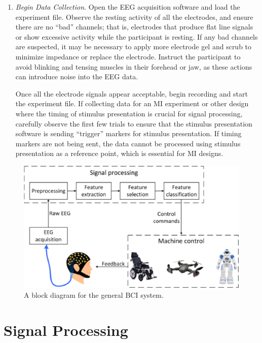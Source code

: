 \documentclass[journal,twocolumn]{IEEEtran}
\begin{document}
\begin{enumerate}
\item \emph{Begin Data Collection}.
Open the EEG acquisition software and load the experiment file. Observe the resting activity of all the electrodes, and ensure there are no “bad” channels; that is, electrodes that produce flat line signals or show excessive activity while the participant is resting. If any bad channels are suspected, it may be necessary to apply more electrode gel and scrub to minimize impedance or replace the electrode. Instruct the participant to avoid blinking and tensing muscles in their forehead or jaw, as these actions can introduce noise into the EEG data.

Once all the electrode signals appear acceptable, begin recording and start the experiment file. If collecting data for an MI experiment or other design where the timing of stimulus presentation is crucial for signal processing, carefully observe the first few trials to ensure that the stimulus presentation software is sending “trigger” markers for stimulus presentation. If timing markers are not being sent, the data cannot be processed using stimulus presentation as a reference point, which is essential for MI designs.

\end{enumerate}


\begin{figure}[htbp]  %
  \centering  %
  \includegraphics[width=\linewidth]{figures/fig3.eps}  %
  \caption{A block diagram for the general BCI system.}  %
  \label{fig:bci_loop}  %
\end{figure}


\section{Signal Processing} \cite{al2021deep}
\end{document}
